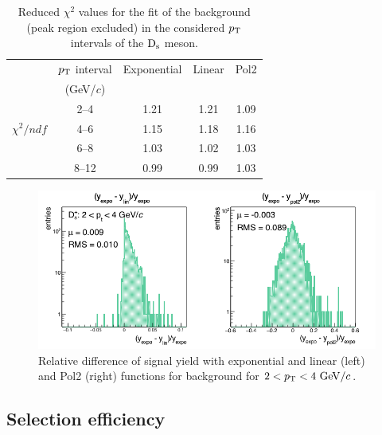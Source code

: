 \begin{table}[!t]
\centering
\vspace{0.5cm}
\begin{tabular}{|c|c|c|c|c|} 
\hline \rule{0pt}{2.7ex}
 & $p_{\rm T}$ interval & Exponential & Linear & Pol2 \\ 
 &(GeV/$c$) & & &  \\ 
\hline \rule{0pt}{2.7ex}
           &\phantom{0}2--4\phantom{0} & 1.21 & 1.21 & 1.09\\
           $\chi^2/ndf$ &\phantom{0}4--6\phantom{0} & 1.15 & 1.18 & 1.16\\
          &\phantom{0}6--8\phantom{0} & 1.03 & 1.02 & 1.03\\
           &\phantom{0}8--12 & 0.99 & 0.99  & 1.03\\
\hline
\end{tabular}
\caption{Reduced $\chi^2$ values for the fit of the background (peak region excluded) in the
considered $p_{\rm T}$ intervals of the ${\rm D_s}$ meson.} 
\label{tab:chi2bkg}
\end{table}

\begin{figure}[!htb]
\begin{center}
 \includegraphics[width=.70\textwidth]{FigCap4/studyBkg_Free_pt0.png}
\caption{Relative difference of signal yield with exponential and linear (left) and Pol2 (right) 
functions for background for $2 < p_{\rm T} < 4 ~\mathrm{GeV}/c$.}             
\label{fig:diffBkgPt0}
\end{center}
\end{figure}


\subsection{Selection efficiency}

